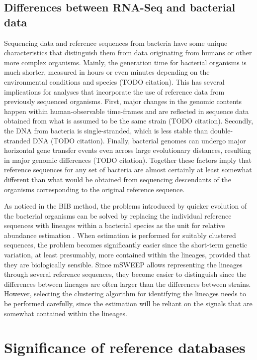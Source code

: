 \documentclass[officiallayout]{tktla}
\begin{document}
\subsection{Differences between RNA-Seq and bacterial data}
\label{section:bacterial-data}

Sequencing data and reference sequences from bacteria have some unique
characteristics that distinguish them from data originating from
humans or other more complex organisms. Mainly, the generation time
for bacterial organisms is much shorter, measured in hours or even
minutes depending on the environmental conditions and species (TODO
citation). This has several implications for analyses that incorporate
the use of reference data from previously sequenced organisms. First,
major changes in the genomic contents happen within human-observable
time-frames and are reflected in sequence data obtained from what is
assumed to be the same strain (TODO citation). Secondly, the DNA from
bacteria is single-stranded, which is less stable than double-stranded
DNA (TODO citation). Finally, bacterial genomes can undergo major
horizontal gene transfer events even across large evolutionary
distances, resulting in major genomic differences (TODO
citation). Together these factors imply that reference sequences for
any set of bacteria are almost certainly at least somewhat different
than what would be obtained from sequencing descendants of the
organisms corresponding to the original reference sequence.

As noticed in the BIB method, the problems introduced by quicker
evolution of the bacterial organisms can be solved by replacing the
individual reference sequences with lineages within a bacterial
species as the unit for relative abundance estimation
\citep{sankar2016bayesian}. When estimation is performed for suitably
clustered sequences, the problem becomes significantly easier since
the short-term genetic variation, at least presumably, more contained
within the lineages, provided that they are biologically
sensible. Since mSWEEP allows representing the lineages through
several reference sequences, they become easier to distinguish since
the differences between lineages are often larger than the differences
between strains. However, selecting the clustering algorithm for
identifying the lineages needs to be performed carefully, since the
estimation will be reliant on the signals that are somewhat contained
within the lineages.

\section{Significance of reference databases}
\end{document}
